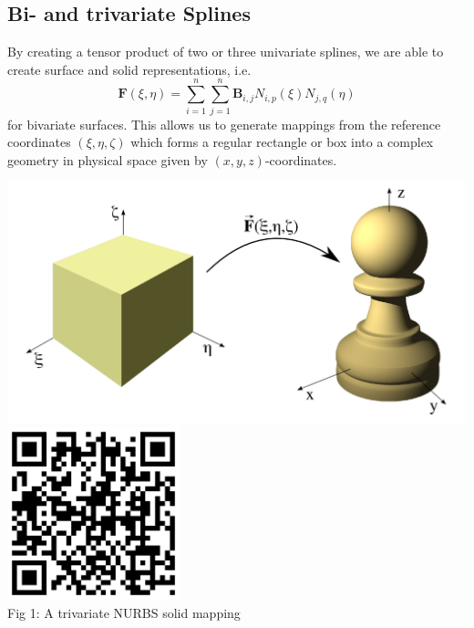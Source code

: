 \documentclass[landscape]{sintefposter}
\begin{document}
\begin{multicols}{3}
\section{Bi- and trivariate Splines}
By creating a tensor product of two or three univariate splines, we are able to create surface and solid representations, i.e.
\begin{equation}
  \mathbf{F}(\xi,\eta) = \sum_{i=1}^n \sum_{j=1}^n \mathbf{B}_{i,j} N_{i,p}(\xi)N_{j,q}(\eta)
\end{equation}
for bivariate surfaces.
This allows us to generate mappings from the reference coordinates $(\xi,\eta,\zeta)$ which forms a regular rectangle or box into a complex geometry in physical space given by $(x,y,z)$-coordinates.
\begin{center}
  \includegraphics[width=16cm]{pawn-mapping}
  \includegraphics[height=5cm]{MappingQR} \\
  \normalsize{Fig 1: A trivariate NURBS solid mapping}
\end{center}

\vspace{1cm}


\end{multicols}
\end{document}
